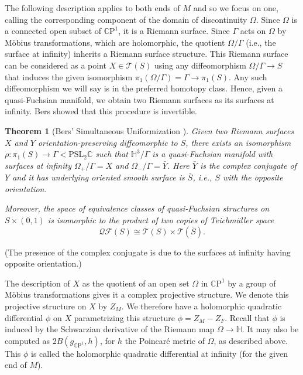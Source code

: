 \documentclass{amsart}
\newcommand{\C}{\mathbb{C}}
\newcommand{\CP}{\mathbb{C}\mathrm{P}}
\renewcommand{\H}{\mathbb{H}}
\newtheorem{thm}{Theorem}[section]
\begin{document}
The following description applies to both ends of $M$ and so we focus on one, calling the corresponding component of the domain of discontinuity $\Omega$. 
Since $\Omega$ is a connected open subset of $\CP^1$, it is a Riemann surface. 
Since $\Gamma$ acts on $\Omega$ by M\"obius transformations, which are holomorphic, the quotient $\Omega/\Gamma$ (i.e., the surface at infinity) inherits a Riemann surface structure. 
This Riemann surface can be considered as a point $X \in \mathcal{T}(S)$ using any diffeomorphism $\Omega/\Gamma \to S$ that induces the given isomorphism $\pi_1(\Omega/\Gamma) = \Gamma \to \pi_1(S)$.
Any such diffeomorphism we will say is in the preferred homotopy class.
Hence, given a quasi-Fuchsian manifold, we obtain two Riemann surfaces as its surfaces at infinity. 
Bers showed that this procedure is invertible. 

\begin{thm}[Bers' Simultaneous Uniformization \cite{bers1960}]
Given two Riemann surfaces $X$ and $Y$ orientation-preserving diffeomorphic to $S$, there exists an isomorphism $\rho: \pi_1(S) \to \Gamma < \mathrm{PSL}_2\C$ such that $\H^3/\Gamma$ is a quasi-Fuchsian manifold with surfaces at infinity $\Omega_+/\Gamma = X$ and $\Omega_- / \Gamma = \bar{Y}$.
Here $\bar{Y}$ is the complex conjugate of $Y$ and it has underlying oriented smooth surface is $\bar{S}$, i.e., $S$ with the opposite orientation.

Moreover, the space of equivalence classes of quasi-Fuchsian structures on $S \times (0,1)$ is isomorphic to the product of two copies of Teichm\"uller space
\[
\mathcal{QF}(S) \cong \mathcal{T}(S) \times \mathcal{T}(\bar{S}).
\]
\end{thm}

\noindent (The presence of the complex conjugate is due to the surfaces at infinity having opposite orientation.)

The description of $X$ as the quotient of an open set $\Omega$ in $\CP^1$ by a group of M\"obius transformations gives it a complex projective structure. 
We denote this projective structure on $X$ by $Z_M$. 
We therefore have a holomorphic quadratic differential $\phi$ on $X$ parametrizing this structure $\phi = Z_M - Z_F$. 
Recall that $\phi$ is induced by the Schwarzian derivative of the Riemann map $\Omega \to \H$. 
It may also be computed as $2B(g_{\CP^1},h)$, for $h$ the Poincar\'e metric of $\Omega$, as described above. 
This $\phi$ is called the holomorphic quadratic differential at infinity (for the given end of $M$).
\end{document}
